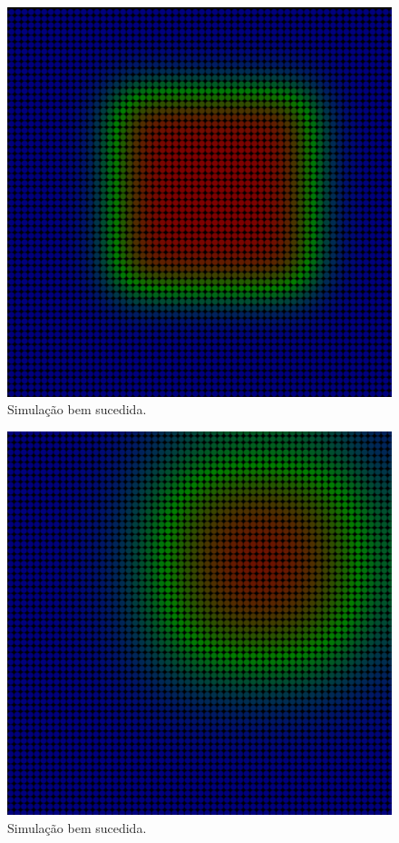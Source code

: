 \documentclass[xcolor=dvipsnames,10pt,aspectratio=169]{beamer}
\begin{document}
\begin{frame}
\begin{minipage}[h!]{0.30\textwidth}
\begin{figure}[h!]
			\includegraphics[trim = {1cm 1cm 1cm 1cm}, clip , angle=0, scale=0.3]{sucesso_velocidade_2}
			\caption{Simulação bem sucedida.}
		\end{figure}
	\end{minipage}
	\begin{minipage}[h!]{0.30\textwidth}
		\begin{figure}[h!]
			\centering
			\includegraphics[trim = {1cm 1cm 1cm 1cm}, clip , angle=0, scale=0.3]{sucesso_velocidade_3}
			\caption{Simulação bem sucedida.}
		\end{figure}
	\end{minipage}
\end{frame}	
	
\end{document}
